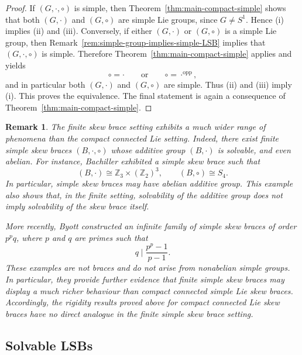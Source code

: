 \documentclass[reqno]{amsart}
\newtheorem{remark}[theorem]{Remark}
\begin{document}
\begin{proof}
If $(G,\cdot,\circ)$ is simple, then Theorem~\ref{thm:main-compact-simple}
shows that both $(G,\cdot)$ and $(G,\circ)$ are simple Lie groups, since
$G\neq S^1$. Hence \textup{(i)} implies \textup{(ii)} and \textup{(iii)}.
Conversely, if either $(G,\cdot)$ or $(G,\circ)$ is a simple Lie group, then
Remark~\ref{rem:simple-group-implies-simple-LSB} implies that
$(G,\cdot,\circ)$ is simple. Therefore Theorem~\ref{thm:main-compact-simple}
applies and yields
\[
\circ=\cdot
\qquad\text{or}\qquad
\circ=\cdot^{\mathrm{opp}},
\]
and in particular both $(G,\cdot)$ and $(G,\circ)$ are simple. Thus
\textup{(ii)} and \textup{(iii)} imply \textup{(i)}.
This proves the equivalence. The final statement is again a consequence of
Theorem~\ref{thm:main-compact-simple}.
\end{proof}


\begin{remark}\label{rem:finite-simple-skew-braces-solvable}\rm
The finite skew brace setting exhibits a much wider range of phenomena than the
compact connected Lie setting. Indeed, there exist finite simple skew braces
\((B,\cdot,\circ)\) whose additive group \((B,\cdot)\) is solvable, and even
abelian. For instance, Bachiller \cite{Bachiller2016Counterexample} exhibited a
simple skew brace such that
\[
(B,\cdot)\cong \mathbb Z_{3}\times (\mathbb Z_{2})^{3},
\qquad
(B,\circ)\cong S_{4}.
\]
In particular, simple skew braces may have abelian additive group. This example
also shows that, in the finite setting, solvability of the additive group does
not imply solvability of the skew brace itself.

More recently, Byott \cite{Byott2024simple} constructed an infinite family of
simple skew braces of order \(p^{p}q\), where \(p\) and \(q\) are primes such
that
\[
q \mid \frac{p^{p}-1}{p-1}.
\]
These examples are not braces and do not arise from nonabelian simple groups.
In particular, they provide further evidence that finite simple skew braces may
display a much richer behaviour than compact connected simple Lie skew braces.
Accordingly, the rigidity results proved above for compact connected Lie skew
braces have no direct analogue in the finite simple skew brace setting.
\end{remark}

\subsection{Solvable LSBs}\label{subsec:solvability}
\end{document}
